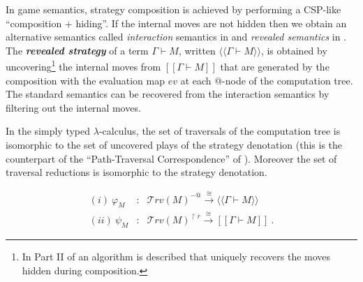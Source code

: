 \documentclass{llncs}
\newcommand\defname[1]{{\bf\em #1}\index{#1}}
\newcommand\travset{\mathcal{T}rv}
\newcommand{\sem}[1]{{[\![ #1 ]\!]}}
\newcommand{\intersem}[1]{{\langle\!\langle #1 \rangle\!\rangle}}
\begin{document}
In game semantics, strategy composition is achieved by performing a
CSP-like ``composition + hiding''. If the internal moves are not hidden
then we obtain an alternative semantics called \emph{interaction}
semantics in \cite{DBLP:conf/sas/DimovskiGL05} and \emph{revealed
semantics} in \cite{willgreenlandthesis}.
The \defname{revealed strategy} of a term $\Gamma \vdash M$, written $\intersem{\Gamma \vdash M}$, is obtained by uncovering\footnote{In Part II of \cite{hylandong_pcf} an algorithm is described that
uniquely recovers the moves hidden during composition.} the
internal moves from $\sem{\Gamma \vdash M}$ that are generated by the composition with the evaluation map $ev$ at each @-node of the computation tree.
The standard semantics can be recovered from the interaction semantics by filtering out the internal moves.

In the simply typed $\lambda$-calculus, the set of traversals of the computation tree is isomorphic to the set of uncovered plays of the strategy
denotation (this is the counterpart of the ``Path-Traversal Correspondence'' of \cite{OngLics2006}). Moreover
the set of traversal reductions is isomorphic to the strategy denotation.
\begin{theorem}
\label{thm:correspondence}
\begin{eqnarray*}
(i) \  \varphi_M  &:& \travset(M)^{-@} \stackrel{\cong}{\longrightarrow} \intersem{\Gamma \vdash M} \\
(ii) \  \psi_M  &:& \travset(M)^{\upharpoonright r} \stackrel{\cong}{\longrightarrow} \sem{\Gamma \vdash M} \ .
\end{eqnarray*}
\end{theorem}
\end{document}
